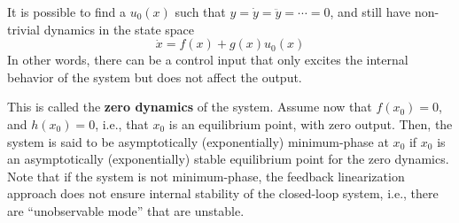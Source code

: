 It is possible to find a $u_0(x)$ such that $y=\dot{y}=\ddot{y}=\cdots=0$, and still have non-trivial dynamics in the state space 
\begin{equation*}
    \dot{x} = f(x) + g(x)u_0(x)
\end{equation*}
In other words, there can be a control input that only excites the internal behavior of the system but does not affect the output.

This is called the \textbf{zero dynamics} of the system.
\newpar{}
Assume now that $f(x_0) = 0$, and $h(x_0) = 0$, i.e., that $x_0$ is an equilibrium point, with zero output. Then, the system is said to be asymptotically (exponentially) minimum-phase at $x_0$ if $x_0$ is an asymptotically (exponentially) stable equilibrium point for the zero dynamics.
\newpar{}
Note that if the system is not minimum-phase, the feedback linearization approach does not ensure internal stability of the closed-loop system, i.e., there are ``unobservable mode'' that are unstable.